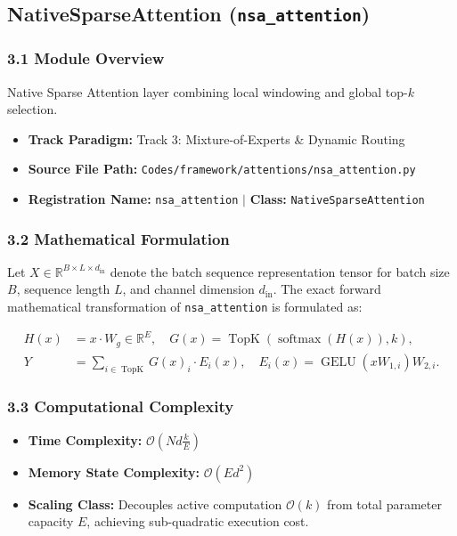 \subsection{NativeSparseAttention (\texttt{nsa\_attention})}
\label{sec:app_module_nsa_attention}

\subsubsection*{3.1 Module Overview}
Native Sparse Attention layer combining local windowing and global top-$k$ selection.
\begin{itemize}
    \item \textbf{Track Paradigm:} Track 3: Mixture-of-Experts \& Dynamic Routing
    \item \textbf{Source File Path:} \texttt{Codes/framework/attentions/nsa\_attention.py}
    \item \textbf{Registration Name:} \texttt{nsa\_attention} $\mid$ \textbf{Class:} \texttt{NativeSparseAttention}
\end{itemize}

\subsubsection*{3.2 Mathematical Formulation}
Let $X \in \mathbb{R}^{B \times L \times d_{\text{in}}}$ denote the batch sequence representation tensor for batch size $B$, sequence length $L$, and channel dimension $d_{\text{in}}$. The exact forward mathematical transformation of \texttt{nsa\_attention} is formulated as:

\begin{align}
H(x) &= x \cdot W_g \in \mathbb{R}^{E}, \quad G(x) = \operatorname{TopK}\left(\operatorname{softmax}(H(x)), k\right), \\
Y &= \sum_{i \in \operatorname{TopK}} G(x)_i \cdot E_i(x), \quad E_i(x) = \operatorname{GELU}(x W_{1, i}) W_{2, i}.
\end{align}


\subsubsection*{3.3 Computational Complexity}
\begin{itemize}
    \item \textbf{Time Complexity:} $\mathcal{O}(N d \frac{k}{E})$
    \item \textbf{Memory State Complexity:} $\mathcal{O}(E d^2)$
    \item \textbf{Scaling Class:} Decouples active computation $\mathcal{O}(k)$ from total parameter capacity $E$, achieving sub-quadratic execution cost.
\end{itemize}

